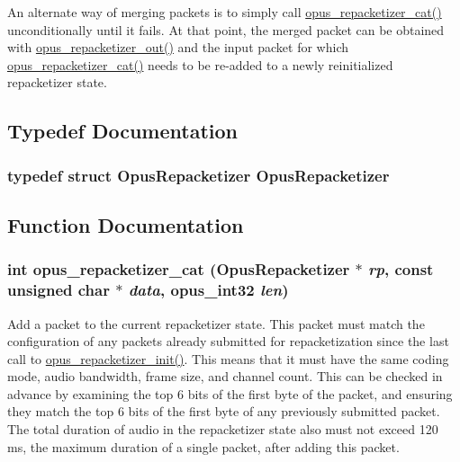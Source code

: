 An alternate way of merging packets is to simply call \hyperlink{group__opus__repacketizer_ga2840dd56bfa37f8c6874355b9ce8fb46}{opus\_\-repacketizer\_\-cat()} unconditionally until it fails. At that point, the merged packet can be obtained with \hyperlink{group__opus__repacketizer_ga19ff1e91a8fa652380f972a224a26481}{opus\_\-repacketizer\_\-out()} and the input packet for which \hyperlink{group__opus__repacketizer_ga2840dd56bfa37f8c6874355b9ce8fb46}{opus\_\-repacketizer\_\-cat()} needs to be re-\/added to a newly reinitialized repacketizer state. 

\subsection{Typedef Documentation}
\hypertarget{group__opus__repacketizer_ga1f85070a64bcbf5bf24f5ccb80323e7b}{
\subsubsection[{OpusRepacketizer}]{\setlength{\rightskip}{0pt plus 5cm}typedef struct {\bf OpusRepacketizer} {\bf OpusRepacketizer}}}
\label{group__opus__repacketizer_ga1f85070a64bcbf5bf24f5ccb80323e7b}


\subsection{Function Documentation}
\hypertarget{group__opus__repacketizer_ga2840dd56bfa37f8c6874355b9ce8fb46}{
\subsubsection[{opus\_\-repacketizer\_\-cat}]{\setlength{\rightskip}{0pt plus 5cm}int opus\_\-repacketizer\_\-cat ({\bf OpusRepacketizer} $\ast$ {\em rp}, \/  const unsigned char $\ast$ {\em data}, \/  {\bf opus\_\-int32} {\em len})}}
\label{group__opus__repacketizer_ga2840dd56bfa37f8c6874355b9ce8fb46}


Add a packet to the current repacketizer state. This packet must match the configuration of any packets already submitted for repacketization since the last call to \hyperlink{group__opus__repacketizer_gab42ff7c3f8a49ff5029fcf60f3b853f0}{opus\_\-repacketizer\_\-init()}. This means that it must have the same coding mode, audio bandwidth, frame size, and channel count. This can be checked in advance by examining the top 6 bits of the first byte of the packet, and ensuring they match the top 6 bits of the first byte of any previously submitted packet. The total duration of audio in the repacketizer state also must not exceed 120 ms, the maximum duration of a single packet, after adding this packet.

